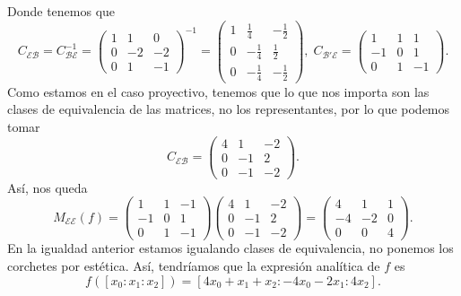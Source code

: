 \begin{eg}
Donde tenemos que 
\[C_{\mathcal{E}\mathcal{B}} = C_{\mathcal{B}\mathcal{E}}^{-1} = \begin{pmatrix} 1 & 1 & 0 \\ 0 & - 2 & - 2 \\ 0 & 1 & -1 \end{pmatrix}^{-1} = \begin{pmatrix} 1 & \frac{1}{4} & -\frac{1}{2} \\ 0 & -\frac{1}{4} & \frac{1}{2} \\ 0 & -\frac{1}{4} & -\frac{1}{2} \end{pmatrix}, \; C_{\mathcal{B}'\mathcal{E}} = \begin{pmatrix} 1 & 1 & 1 \\ -1 & 0 & 1 \\ 0 & 1 & -1 \end{pmatrix} .\]
Como estamos en el caso proyectivo, tenemos que lo que nos importa son las clases de equivalencia de las matrices, no los representantes, por lo que podemos tomar
\[ C_{\mathcal{E}\mathcal{B}} = \begin{pmatrix} 4 & 1 & - 2 \\ 0 & - 1 & 2 \\ 0 & - 1 & - 2 \end{pmatrix} .\]
Así, nos queda
\[M_{\mathcal{E}\mathcal{E}}\left(f\right) = \begin{pmatrix} 1 & 1 & -1 \\ -1 & 0 & 1 \\ 0 & 1 & - 1 \end{pmatrix}\begin{pmatrix} 4 & 1 & -2\\ 0 & - 1 & 2 \\ 0 & - 1 & -2 \end{pmatrix} = \begin{pmatrix} 4 & 1 & 1 \\ -4 & -2 & 0 \\ 0 & 0 & 4 \end{pmatrix} .\]
En la igualdad anterior estamos igualando clases de equivalencia, no ponemos los corchetes por estética. Así, tendríamos que la expresión analítica de $\displaystyle f $ es
\[f\left([x_{0}:x_{1}:x_{2}]\right) = [4x_{0}+x_{1}+x_{2}:-4x_{0}-2x_{1}:4x_{2}] .\]
\end{eg}


